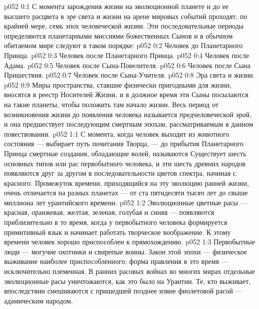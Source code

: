 \author{Могучий Вестник}
\vs p052 0:1 С момента зарождения жизни на эволюционной планете и до ее высшего расцвета в эре света и жизни на арене мировых событий проходят, по крайней мере, семь эпох человеческой жизни. Эти последовательные периоды определяются планетарными миссиями божественных Сынов и в обычном обитаемом мире следуют в таком порядке:
\vs p052 0:2 \bibnobreakspace Человек до Планетарного Принца.
\vs p052 0:3 \bibnobreakspace Человек после Планетарного Принца.
\vs p052 0:4 \bibnobreakspace Человек после Адама.
\vs p052 0:5 \bibnobreakspace Человек после Сына\hyp{}Повелителя.
\vs p052 0:6 \bibnobreakspace Человек после Сына Пришествия.
\vs p052 0:7 \bibnobreakspace Человек после Сына\hyp{}Учителя.
\vs p052 0:8 \bibnobreakspace Эра света и жизни.
\vs p052 0:9 \pc Миры пространства, ставшие физически пригодными для жизни, вносятся в реестр Носителей Жизни, и в должное время эти Сыны посылаются на такие планеты, чтобы положить там начало жизни. Весь период от возникновения жизни до появления человека называется предчеловеческой эрой, и она предшествует последующим смертным эпохам, рассматриваемым в данном повествовании.
\vs p052 1:1 С момента, когда человек выходит из животного состояния --- выбирает путь почитания Творца, --- до прибытия Планетарного Принца смертные создания, обладающие волей, называются  Существует шесть основных типов или рас первобытного человека, и эти шесть древних народов появляются друг за другом в последовательности цветов спектра, начиная с красного. Промежуток времени, приходящийся на эту эволюцию ранней жизни, очень отличается на разных планетах --- от ста пятидесяти тысяч лет до свыше миллиона лет урантийского времени.
\vs p052 1:2 Эволюционные цветные расы --- красная, оранжевая, желтая, зеленая, голубая и синяя --- появляются приблизительно в то время, когда у первобытного человека формируется примитивный язык и начинает работать творческое воображение. К этому времени человек хорошо приспособлен к прямохождению.
\vs p052 1:3 \pc Первобытные люди --- могучие охотники и свирепые воины. Закон этой эпохи --- физическое выживание наиболее приспособленного; форма правления в это время --- исключительно племенная. В ранних расовых войнах во многих мирах отдельные эволюционные расы уничтожаются, как это было на Урантии. Те, кто выживает, впоследствии смешиваются с пришедшей позднее извне фиолетовой расой --- адамическим народом.
